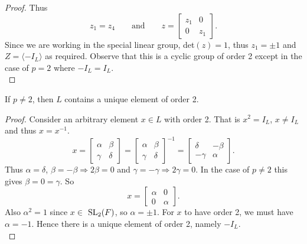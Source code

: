 \begin{proof}
\noindent Thus \begin{equation*} z_1 = z_4 \qquad  \text{and} \qquad z =  \begin{bmatrix} z_1 & 0 \\ 0 & z_1 \end{bmatrix}. \end{equation*}
\noindent Since we are working in the special linear group, det$(z)=1$, thus $z_1 = \pm 1$ and $Z = \langle - I_L \rangle$ as required. Observe that this is a cyclic group of order 2 except in the case of $p=2$ where $- I_L = I_L$. \\
\end{proof}

\begin{lemma} \label{6.2b} If $p\neq 2$, then $L$ contains a unique element of order 2. \\
\end{lemma}

\begin{proof} Consider an arbitrary element $x \in L$ with order 2. That is $x^2 = I_L$, $x \neq I_L$ and thus $x=x^{-1}$.
\begin{equation*} x = \begin{bmatrix} \alpha & \beta \\ \gamma & \delta \end{bmatrix} = \begin{bmatrix} \alpha & \beta \\ \gamma & \delta \end{bmatrix}^{-1} = \begin{bmatrix} \delta & - \beta \\ - \gamma & \alpha \end{bmatrix}.
\end{equation*}
\noindent Thus $\alpha = \delta$, $\beta = - \beta \Rightarrow 2\beta = 0$ and $\gamma = - \gamma \Rightarrow 2\gamma = 0$. In the case of $p \neq 2$ this gives $\beta = 0 = \gamma$. So
\begin{equation*} x = \begin{bmatrix} \alpha & 0 \\ 0 & \alpha \end{bmatrix}.
\end{equation*}
\noindent Also $\alpha ^2 = 1$ since $x \in$ $\operatorname{SL}_2(F)$, so $\alpha = \pm 1$. For $x$ to have order 2, we must have $\alpha = - 1$. Hence there is a unique element of order 2, namely $- I_L$.
\\
\end{proof}

